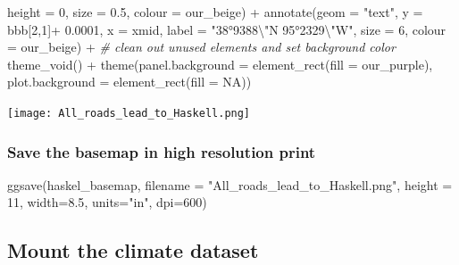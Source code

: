 \documentclass[
  paper=a4,
  ,captions=tableheading
]{scrartcl}
\newenvironment{Shaded}{\begin{snugshade}}{\end{snugshade}}
\newcommand{\AttributeTok}[1]{\textcolor[rgb]{0.77,0.63,0.00}{#1}}
\newcommand{\CommentTok}[1]{\textcolor[rgb]{0.56,0.35,0.01}{\textit{#1}}}
\newcommand{\ConstantTok}[1]{\textcolor[rgb]{0.00,0.00,0.00}{#1}}
\newcommand{\DecValTok}[1]{\textcolor[rgb]{0.00,0.00,0.81}{#1}}
\newcommand{\FloatTok}[1]{\textcolor[rgb]{0.00,0.00,0.81}{#1}}
\newcommand{\FunctionTok}[1]{\textcolor[rgb]{0.00,0.00,0.00}{#1}}
\newcommand{\NormalTok}[1]{#1}
\newcommand{\SpecialCharTok}[1]{\textcolor[rgb]{0.00,0.00,0.00}{#1}}
\newcommand{\StringTok}[1]{\textcolor[rgb]{0.31,0.60,0.02}{#1}}
\begin{document}
\begin{Shaded}
\begin{Highlighting}[]
           \AttributeTok{height =} \DecValTok{0}\NormalTok{, }\AttributeTok{size =} \FloatTok{0.5}\NormalTok{, }\AttributeTok{colour =}\NormalTok{ our\_beige) }\SpecialCharTok{+}
  \FunctionTok{annotate}\NormalTok{(}\AttributeTok{geom =} \StringTok{"text"}\NormalTok{, }\AttributeTok{y =}\NormalTok{ bbb[}\DecValTok{2}\NormalTok{,}\DecValTok{1}\NormalTok{]}\SpecialCharTok{+} \FloatTok{0.0001}\NormalTok{, }\AttributeTok{x =}\NormalTok{  xmid,}
           \AttributeTok{label =} \StringTok{"38°93\textquotesingle{}88}\SpecialCharTok{\textbackslash{}"}\StringTok{N  95°23\textquotesingle{}29}\SpecialCharTok{\textbackslash{}"}\StringTok{W"}\NormalTok{,  }\AttributeTok{size =} \DecValTok{6}\NormalTok{,}
           \AttributeTok{colour =}\NormalTok{ our\_beige) }\SpecialCharTok{+}
  \CommentTok{\# clean out unused elements and set background color}
  \FunctionTok{theme\_void}\NormalTok{() }\SpecialCharTok{+}
  \FunctionTok{theme}\NormalTok{(}\AttributeTok{panel.background =} \FunctionTok{element\_rect}\NormalTok{(}\AttributeTok{fill =}\NormalTok{ our\_purple),}
        \AttributeTok{plot.background =} \FunctionTok{element\_rect}\NormalTok{(}\AttributeTok{fill =} \ConstantTok{NA}\NormalTok{))}
\end{Highlighting}
\end{Shaded}

\texttt{[image: All\_roads\_lead\_to\_Haskell.png]}

\hypertarget{save-the-basemap-in-high-resolution-print}{%
\subsubsection{Save the basemap in high resolution
print}\label{save-the-basemap-in-high-resolution-print}}

\begin{Shaded}
\begin{Highlighting}[]
\FunctionTok{ggsave}\NormalTok{(haskel\_basemap, }\AttributeTok{filename =} \StringTok{"All\_roads\_lead\_to\_Haskell.png"}\NormalTok{, }\AttributeTok{height =} \DecValTok{11}\NormalTok{, }\AttributeTok{width=}\FloatTok{8.5}\NormalTok{, }
       \AttributeTok{units=}\StringTok{"in"}\NormalTok{, }\AttributeTok{dpi=}\DecValTok{600}\NormalTok{)}
\end{Highlighting}
\end{Shaded}

\hypertarget{mount-the-climate-dataset}{%
\subsection{Mount the climate dataset}\label{mount-the-climate-dataset}}
\end{document}
